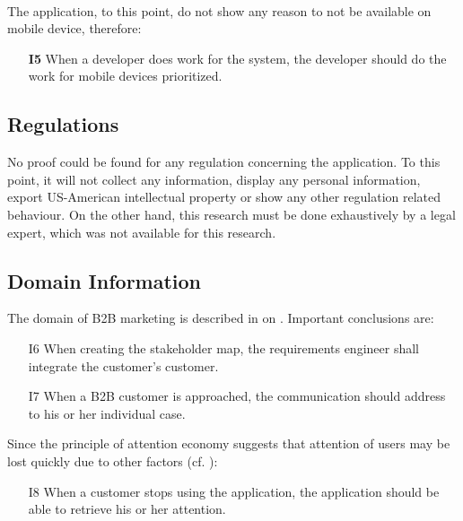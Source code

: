 \paragraph{} The application, to this point, do not show any reason to not be available on mobile device, therefore:

\begin{itemize}
    \item [\textbf{I5}] When a developer does work for the system, the developer should do the work for mobile devices prioritized.
\end{itemize}

\subsection{Regulations}
No proof could be found for any regulation concerning the application. To this point, it will not collect any information, display any personal information, export US-American intellectual property or show any other regulation related behaviour. On the other hand, this research must be done exhaustively by a legal expert, which was not available for this research.

\subsection{Domain Information}
The domain of B2B marketing is described in \Cref{} on \cpagerefrange{}{}. Important conclusions are: 

\begin{itemize}
    \item [I6] When creating the stakeholder map, the requirements engineer shall integrate the customer's customer.
    \item [I7] When a B2B customer is approached, the communication should address to his or her individual case.
\end{itemize}

Since the principle of attention economy suggests that attention of users may be lost quickly due to other factors (cf. \Cref{}):

\begin{itemize}
    \item [I8] When a customer stops using the application, the application should be able to retrieve his or her attention.
\end{itemize}

\paragraph{}

